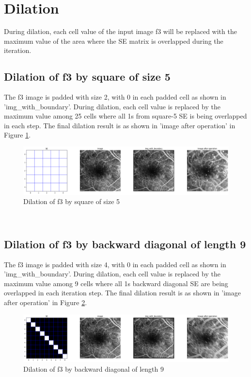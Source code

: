 \documentclass{article}
\begin{document}
\section{Dilation}
During dilation, each cell value of the input image f3 will be replaced with the maximum value of the area where the SE matrix is overlapped during the iteration. \\
\subsection{Dilation of f3 by square of size 5}
The f3 image is padded with size 2, with 0 in each padded cell as shown in 'img\_with\_boundary'. During dilation, each cell value is replaced by the maximum value among 25 cells where all 1s from square-5 SE is being overlapped in each step. The final dilation result is as shown in 'image after operation' in Figure \ref{fig:df3_d3}.\\
\begin{figure}[h!]
\includegraphics[width=\linewidth]{images/df3_d3.png}
\caption{Dilation of f3 by square of size 5}
\label{fig:df3_d3}
\end{figure}
\\ 

\subsection{Dilation of f3 by backward diagonal of length 9}
The f3 image is padded with size 4, with 0 in each padded cell as shown in 'img\_with\_boundary'. During dilation, each cell value is replaced by the maximum value among 9 cells where all 1s backward diagonal SE are being overlapped in each iteration step. The final dilation result is as shown in 'image after operation' in Figure \ref{fig:df3_d4}.\\
\begin{figure}[h!]
\includegraphics[width=\linewidth]{images/df3_d4.png}
\caption{Dilation of f3 by backward diagonal of length 9}
\label{fig:df3_d4}
\end{figure}
\\ 
\end{document}
